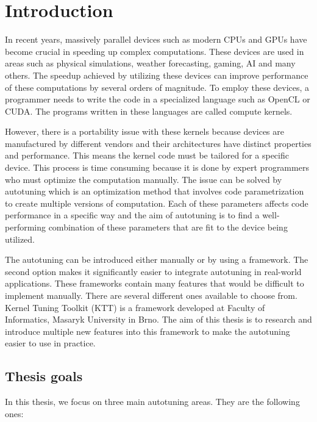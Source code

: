 \documentclass[
  digital,     %
  oneside,     %
  nosansbold,  %
  nocolorbold, %
  lof,         %
  lot,         %
  nocover
]{fithesis4}
\begin{document}
\chapter{Introduction}
In recent years, massively parallel devices such as modern CPUs and GPUs have become crucial in speeding up complex computations. These devices are used in areas such as physical simulations, weather forecasting, gaming, AI and many others. The speedup achieved by utilizing these devices can improve performance of these computations by several orders of magnitude. To employ these devices, a programmer needs to write the code in a specialized language such as OpenCL or CUDA. The programs written in these languages are called compute kernels.

However, there is a portability issue with these kernels because devices are manufactured by different vendors and their architectures have distinct properties and performance. This means the kernel code must be tailored for a specific device. This process is time consuming because it is done by expert programmers who must optimize the computation manually. The issue can be solved by autotuning \cite{balaprakash2018autotuning} which is an optimization method that involves code parametrization to create multiple versions of computation. Each of these parameters affects code performance in a specific way and the aim of autotuning is to find a well-performing combination of these parameters that are fit to the device being utilized.

The autotuning can be introduced either manually or by using a framework. The second option makes it significantly easier to integrate autotuning in real-world applications. These frameworks contain many features that would be difficult to implement manually. There are several different ones available to choose from. Kernel Tuning Toolkit (KTT) is a framework developed at Faculty of Informatics, Masaryk University in Brno. The aim of this thesis is to research and introduce multiple new features into this framework to make the autotuning easier to use in practice.

\section{Thesis goals}
In this thesis, we focus on three main autotuning areas. They are the following ones:
\end{document}
